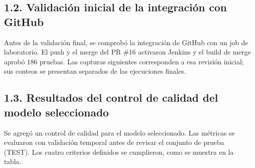 
\subsection{1.2. Validación inicial de la integración con GitHub}

Antes de la validación final, se comprobó la integración de GitHub con un job de laboratorio. El push y el merge del PR \#16 activaron Jenkins y el build de merge aprobó 186 pruebas. Las capturas siguientes corresponden a esa revisión inicial; sus conteos se presentan separados de las ejecuciones finales.







\FloatBarrier


\subsection{1.3. Resultados del control de calidad del modelo seleccionado}

Se agregó un control de calidad para el modelo seleccionado. Las métricas se evaluaron con validación temporal antes de revisar el conjunto de prueba (TEST). Los cuatro criterios definidos se cumplieron, como se muestra en la tabla.


